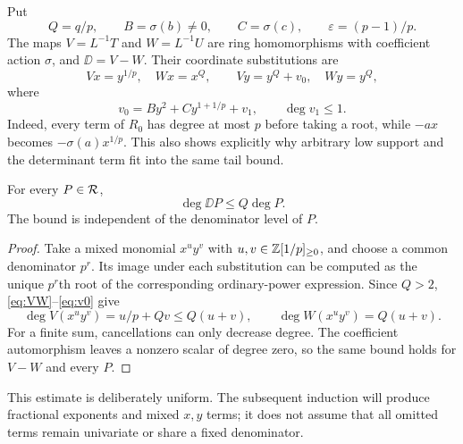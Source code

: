 Put
\begin{equation}\label{eq:low-notation}
 Q=q/p,\qquad B=\sigma(b)\ne0,\qquad C=\sigma(c),\qquad
 \varepsilon=(p-1)/p.
\end{equation}
The maps $V=L^{-1}T$ and $W=L^{-1}U$ are ring homomorphisms with
coefficient action $\sigma$, and $\DD=V-W$. Their coordinate
substitutions are
\begin{equation}\label{eq:VW}
 Vx=y^{1/p},\quad Wx=x^Q,\qquad
 Vy=y^Q+v_0,\quad Wy=y^Q,
\end{equation}
where
\begin{equation}\label{eq:v0}
 v_0=By^2+Cy^{1+1/p}+v_1,\qquad \deg v_1\le1.
\end{equation}
Indeed, every term of $R_0$ has degree at most $p$ before taking
a root, while $-ax$ becomes $-\sigma(a)x^{1/p}$. This also shows
explicitly why arbitrary low support and the determinant term
fit into the same tail bound.

\begin{lemma}\label{lem:mixed}
For every $P\in\mathcal R$,
\begin{equation}\label{eq:perfect-degree-bound}
 \deg\DD P\le Q\deg P.
\end{equation}
The bound is independent of the denominator level of $P$.
\end{lemma}

\begin{proof}
Take a mixed monomial $x^u y^v$ with $u,v\in\mathbb Z[1/p]_{
\ge0}$, and choose a common denominator $p^r$. Its image under
each substitution can be computed as the unique $p^r$th root
of the corresponding ordinary-power expression. Since $Q>2$,
\eqref{eq:VW}--\eqref{eq:v0} give
\[
 \deg V(x^u y^v)=u/p+Qv\le Q(u+v),\qquad
 \deg W(x^u y^v)=Q(u+v).
\]
For a finite sum, cancellations can only decrease degree. The
coefficient automorphism leaves a nonzero scalar of degree zero,
so the same bound holds for $V-W$ and every $P$.
\end{proof}

This estimate is deliberately uniform. The subsequent induction
will produce fractional exponents and mixed $x,y$ terms; it does
not assume that all omitted terms remain univariate or share a
fixed denominator.
